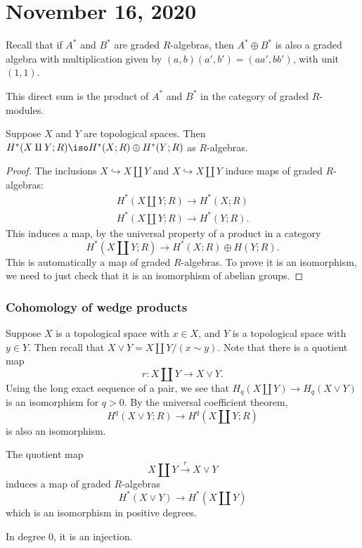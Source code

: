 \documentclass{standalone}
\begin{document}
\chapter{November 16, 2020}

Recall that if \(A^*\) and \(B^*\) are graded \(R\)-algebras, then
\(A^* \oplus B^*\) is also a graded algebra with multiplication given by
\((a, b)(a', b') = (aa', bb')\), with unit \((1, 1)\).

\begin{remark}
  This direct sum is the product of \(A^*\) and \(B^*\) in
  the category of graded \(R\)-modules.
\end{remark}

\begin{proposition}
  Suppose \(X\) and \(Y\) are topological spaces. Then
  \(H^*(X \amalg Y; R) \iso H^*(X; R) \oplus H^*(Y; R)\)
  as \(R\)-algebras.
\end{proposition}
\begin{proof}
  The inclusions \(X \hookrightarrow X \amalg Y\) and
                 \(X \hookrightarrow X \amalg Y\) induce maps
                 of graded \(R\)-algebras:
  \begin{gather*}
    H^*(X \amalg Y; R) \to H^*(X; R) \\
    H^*(X \amalg Y; R) \to H^*(Y; R).
  \end{gather*}
  This induces a map, by the universal property of a product in a category
  \[
    H^*(X \amalg Y; R) \to H^*(X; R) \oplus H(Y; R).
  \]
  This is automatically a map of graded \(R\)-algebras.
  To prove it is an isomorphism, we need to just check that it
  is an isomorphism of abelian groups.
\end{proof}



\subsection{Cohomology of wedge products}
Suppose \(X\) is a topological space with \(x \in X\), and
        \(Y\) is a topological space with \(y \in Y\).
Then recall that \(X \vee Y = X \amalg Y / (x \sim y)\).
Note that there is a quotient map
\[
  r \colon X \amalg Y \to X \vee Y.
\]
Using the long exact sequence of a pair, %
we see that \(H_q(X \amalg Y) \to H_q(X \vee Y)\)
is an isomorphism for \(q > 0\).
By the universal coefficient theorem,
\[
  H^q(X \vee Y; R) \to H^q(X \amalg Y; R)
\]
is also an isomorphism.

\begin{corollary}
  The quotient map
  \[
    X \amalg Y \overset{r}{\to} X \vee Y
  \]
  induces a map of graded \(R\)-algebras
  \[
    H^*(X \vee Y) \to H^*(X \amalg Y)
  \]
  which is an isomorphism in positive degrees.
\end{corollary}
In degree \(0\), it is an injection.
\end{document}
